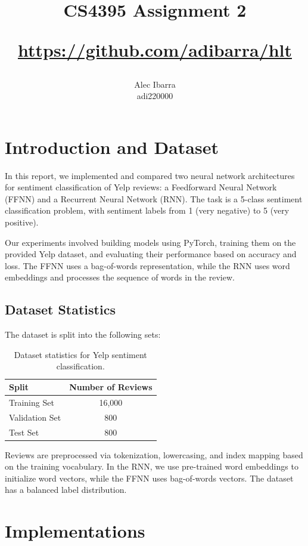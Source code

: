 \documentclass[a4paper]{article}
\title{CS4395 Assignment 2 \\ \begin{small}\url{https://github.com/adibarra/hlt}\end{small}}
\author{Alec Ibarra \\ adi220000}
\date{}
\begin{document}
\maketitle


\section{Introduction and Dataset}

In this report, we implemented and compared two neural network architectures for sentiment classification of Yelp reviews: a Feedforward Neural Network (FFNN) and a Recurrent Neural Network (RNN). The task is a 5-class sentiment classification problem, with sentiment labels from 1 (very negative) to 5 (very positive).

Our experiments involved building models using PyTorch, training them on the provided Yelp dataset, and evaluating their performance based on accuracy and loss. The FFNN uses a bag-of-words representation, while the RNN uses word embeddings and processes the sequence of words in the review.


\subsection*{Dataset Statistics}
The dataset is split into the following sets:

\begin{table}[H]
\centering
\begin{tabular}{|l|c|}
\hline
\textbf{Split} & \textbf{Number of Reviews} \\
\hline
Training Set & 16,000 \\
Validation Set & 800 \\
Test Set & 800 \\
\hline
\end{tabular}
\caption{Dataset statistics for Yelp sentiment classification.}
\label{tab:dataset}
\end{table}

Reviews are preprocessed via tokenization, lowercasing, and index mapping based on the training vocabulary. In the RNN, we use pre-trained word embeddings to initialize word vectors, while the FFNN uses bag-of-words vectors. The dataset has a balanced label distribution.


\section{Implementations}
\end{document}
